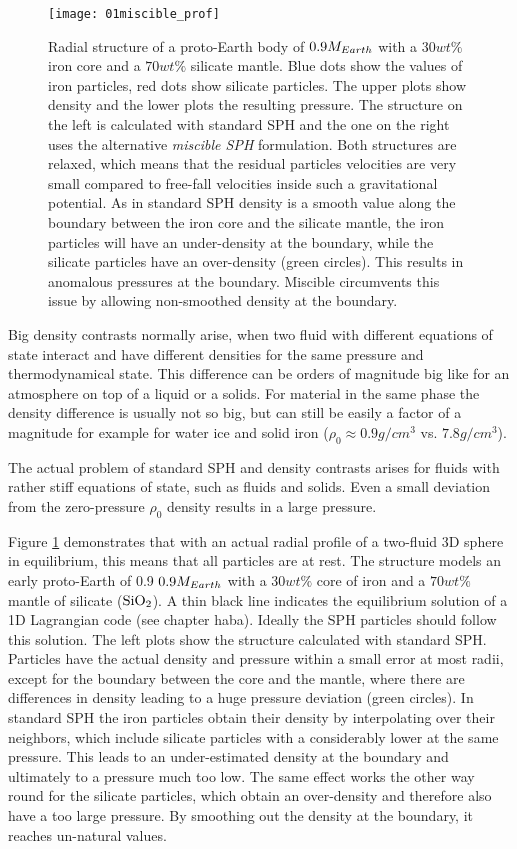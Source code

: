 \begin{figure}[htbp]
\begin{center}
\texttt{[image: 01miscible\_prof]}
\caption{Radial structure of a proto-Earth body of $0.9M_{Earth}$ with a $30wt\%$ iron core and a $70wt\%$ silicate mantle. Blue dots show the values of iron particles, red dots show silicate particles. The upper plots show density and the lower plots the resulting pressure. The structure on the left is calculated with standard SPH and the one on the right uses the alternative \emph{miscible SPH} formulation. Both structures are relaxed, which means that the residual particles velocities are very small compared to free-fall velocities inside such a gravitational potential. As in standard SPH density is a smooth value along the boundary between the iron core and the silicate mantle, the iron particles will have an under-density at the boundary, while the silicate particles have an over-density (green circles). This results in anomalous pressures at the boundary. Miscible circumvents this issue by allowing non-smoothed density at the boundary.}
\label{ch02_fig01}
\end{center}
\end{figure}

Big density contrasts normally arise, when two fluid with different equations of state interact and have different densities for the same pressure and thermodynamical state. This difference can be orders of magnitude big like for an atmosphere on top of a liquid or a solids. For material in the same phase the density difference is usually not so big, but can still be easily a factor of a magnitude for example for water ice and solid iron ($\rho_0 \approx 0.9 g/cm^3$ vs. $7.8 g/cm^3$).

The actual problem of standard SPH and density contrasts arises for fluids with rather stiff equations of state, such as fluids and solids. Even a small deviation from the zero-pressure $\rho_0$ density results in a large pressure. 

Figure \ref{ch02_fig01} demonstrates that with an actual radial profile of a two-fluid 3D sphere in equilibrium, this means that all particles are at rest. The structure models an early proto-Earth of 0.9 $0.9 M_{Earth}$ with a $30 wt\%$ core of iron and a $70 wt\%$ mantle of silicate ($\mathrm{SiO}_2$). A thin black line indicates the equilibrium solution of a 1D Lagrangian code (see chapter haba). Ideally the SPH particles should follow this solution. The left plots show the structure calculated with standard SPH. Particles have the actual density and pressure within a small error at most radii, except for the boundary between the core and the mantle, where there are differences in density leading to a huge pressure deviation (green circles). In standard SPH the iron particles obtain their density by interpolating over their neighbors, which include silicate particles with a considerably lower at the same pressure. This leads to an under-estimated density at the boundary and ultimately to a pressure much too low. The same effect works the other way round for the silicate particles, which obtain an over-density and therefore also have a too large pressure.  By smoothing out the density at the boundary, it reaches un-natural values. 

